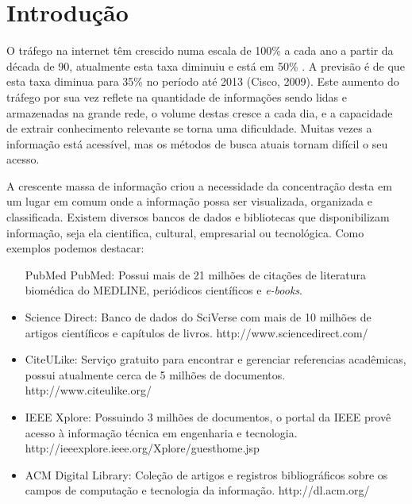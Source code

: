 \chapter{Introdução}
O tráfego na internet têm crescido numa escala de 100\% a cada ano a partir da década de 90, atualmente esta taxa diminuiu e está em 50\% \cite{Odlyzko2003}. A previsão é de que esta taxa diminua para 35\% no período até 2013 (Cisco, 2009). Este aumento do tráfego por sua vez reflete na quantidade de informações sendo lidas e armazenadas na grande rede, o volume destas cresce a cada dia, e a capacidade de extrair conhecimento relevante se torna uma dificuldade. Muitas vezes a informação está acessível, mas os métodos de busca atuais tornam difícil o seu acesso.

A crescente massa de informação criou a necessidade da concentração desta em um lugar em comum onde a informação possa ser visualizada, organizada e classificada. Existem diversos bancos de dados e bibliotecas que disponibilizam informação, seja ela cientifica, cultural, empresarial ou tecnológica. Como exemplos podemos destacar:
\begin{itemize}
\item[PubMed] PubMed: Possui mais de 21 milhões de citações de literatura biomédica do MEDLINE, periódicos científicos e \emph{e-books}.
\item Science Direct: Banco de dados do SciVerse com mais de 10 milhões de artigos científicos e capítulos de livros. http://www.sciencedirect.com/
\item CiteULike: Serviço gratuito para encontrar e gerenciar referencias acadêmicas, possui atualmente cerca de 5 milhões de documentos. http://www.citeulike.org/
\item IEEE Xplore: Possuindo 3 milhões de documentos, o portal da IEEE provê acesso à informação técnica em engenharia e tecnologia. http://ieeexplore.ieee.org/Xplore/guesthome.jsp
\item ACM Digital Library: Coleção de artigos e registros bibliográficos sobre os campos de computação e tecnologia da informação. http://dl.acm.org/
\end{itemize}

